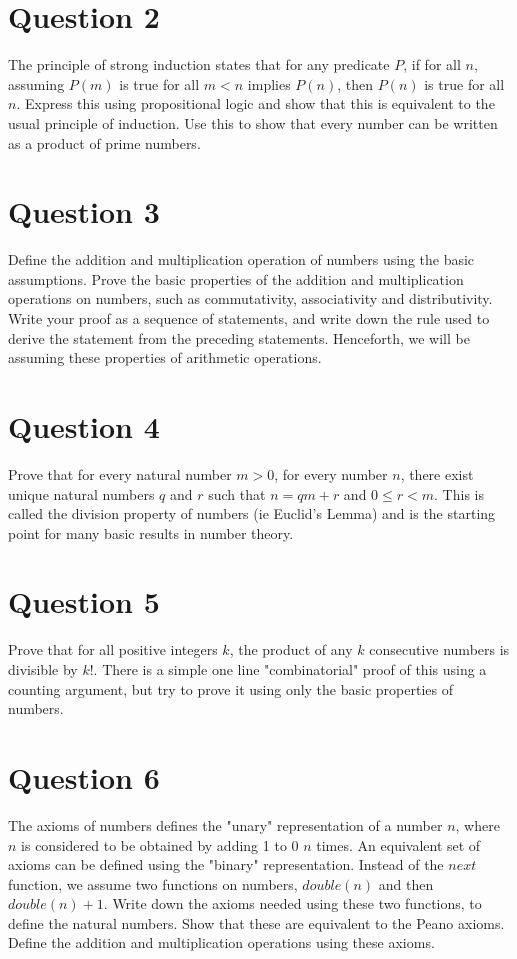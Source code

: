 \documentclass[12pt]{report}
\begin{document}
\section*{Question 2}
The principle of strong induction states that for any predicate $P$, if for all $n$, assuming $P(m)$ is true for all $m < n$ implies $P(n)$, then $P(n)$ is true for all $n$. Express this using propositional logic and show that this is equivalent to the usual principle of induction. Use this to show that every number can be written as a product of prime numbers.
\section*{Question 3}
Define the addition and multiplication operation of numbers using the basic assumptions. Prove the basic properties of the addition and multiplication operations on numbers, such as commutativity, associativity and distributivity.
Write your proof as a sequence of statements, and write down the rule used to derive the statement from the preceding statements. Henceforth, we will be assuming these properties of arithmetic operations.
\section*{Question 4}
Prove that for every natural number $m > 0$, for every number $n$, there exist unique natural numbers $q$ and $r$ such that $n = qm + r$ and $0 \leq r < m$. This
is called the division property of numbers (ie Euclid's Lemma) and is the starting point for many basic results in number theory.
\section*{Question 5}
Prove that for all positive integers $k$, the product of any $k$ consecutive numbers is divisible by $k!$. There is a simple one line "combinatorial" proof of this using a counting argument, but try to prove it using only the basic properties of numbers.
\section*{Question 6}
The axioms of numbers defines the "unary" representation of a number $n$, where $n$ is considered to be obtained by adding 1 to 0 $n$ times.  An equivalent set of axioms can be defined using the "binary" representation. Instead of the $next$ function, we assume two functions on numbers, $double(n)$ and then $double(n) + 1$. Write down the axioms needed using these two functions, to define the natural numbers. Show that these are equivalent to the Peano
axioms. Define the addition and multiplication operations using these axioms.
\end{document}
